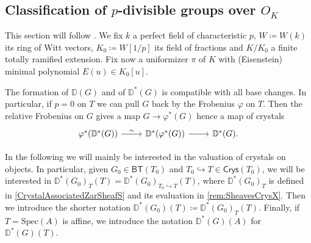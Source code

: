 \subsection{Classification of \texorpdfstring{$p$}{p}-divisible groups
	over \texorpdfstring{$O_{ K }$}{the ring of integers of K}}
This section will follow \cite[Appendix A]{Kisin}.
We fix $k$ a perfect field of characteristic $p$,
$W \coloneqq W(k)$ its ring of Witt vectors, $K_0 \coloneqq W[1/p]$
its field of fractions and $K/K_0$ a finite totally ramified extension.
Fix now a uniformizer $\pi$ of $K$ with (Eisenstein) minimal polynomial
$E(u) \in K_0[u]$.


\begin{rem}[]
	The formation of $\mathbb{D}(G)$ and of $\mathbb{D}^*(G)$ is compatible
	with all base changes. %
	In particular, if $p = 0$ on $T$ we can pull $G$ back by the Frobenius $\varphi$ on $T$.
	Then the relative Frobenius on $G$ gives a map $G \to \varphi^*(G)$
	hence a map of crystals
	\begin{equation*}
	\begin{tikzcd}
		\varphi^* (\mathbb{D}^*(G)) \arrow[r, "\sim", rightarrow] &
		\mathbb{D}^*(\varphi^*(G)) \arrow[r, "", rightarrow] &
		\mathbb{D}^*(G)
	.\end{tikzcd}
	\end{equation*}
\end{rem}


\begin{ntt}[]
	In the following we will mainly be interested in the valuation of
	crystals on objects.
	In particular, given $G_0 \in \mathsf{BT}(T_0)$ and 
	$T_0 \hookrightarrow T \in \mathsf{Crys}(T_0)$, we will be interested
	in $\mathbb{D}^*(G_0)_{T}(T) = \mathbb{D}^*(G_0)_{T_0 \hookrightarrow T}(T)$,
	where $\mathbb{D}^*(G_0)_T$ is defined in \cref{CrystalAssociatedZarSheafS}
	and its evaluation in \cref{rem:SheavesCrysX}.
	Then we introduce the shorter notation
	$\mathbb{D}^*(G_0)(T) \coloneqq \mathbb{D}^*(G_0)_T(T)$.
	Finally, if $T = \mathrm{Spec}(A)$ is affine, we introduce the notation
	$\mathbb{D}^*(G)(A)$ for $\mathbb{D}^*(G)(T)$.
\end{ntt}


